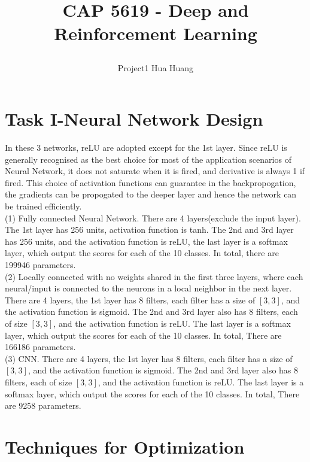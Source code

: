 \documentclass[12pt]{article}
\begin{document}
\title*{\centerline{\huge{CAP 5619 \-- Deep and Reinforcement Learning}}}
\author*{\centerline{Project1 Hua Huang}}%

\section{Task I-Neural Network Design}
In these 3 networks, reLU are adopted except for the 1st layer. Since
reLU is generally recognised as the best choice for most of the
application scenarios of Neural Network, it does not saturate when it
is fired, and derivative is always 1 if fired. This choice of
activation functions can guarantee in the backpropogation, the
gradients can be propogated to the deeper layer and hence the network
can be trained efficiently.\\
(1) Fully connected Neural Network. There are 4 layers(exclude the
input layer). The 1st layer has 256 units, activation function is
tanh. The 2nd and 3rd layer has 256 units, and the activation function
is reLU, the last layer is a softmax layer, which output the scores
for each of the 10 classes. In total, there are 199946 parameters.\\
(2) Locally connected with no weights shared in the first three
layers, where each neural/input is connected to the neurons in a local
neighbor in the next layer. There are 4 layers, the 1st layer has 8
filters, each filter has a size of $[3,3]$, and the activation function is
sigmoid. The 2nd and 3rd layer also has 8 filters, each of size $[3,3]$, and 
the activation function is reLU. The last layer is a softmax layer,
which output the scores for each of the 10 classes. In total, 
There are 166186 parameters.\\
(3) CNN. There are 4 layers, the 1st layer has 8
filters, each filter has a size of $[3,3]$, and the activation function is
sigmoid. The 2nd and 3rd layer also has 8 filters, each of size $[3,3]$, and 
the activation function is reLU. The last layer is a softmax layer,
which output the scores for each of the 10 classes. In total, 
There are 9258 parameters.\\

\section{Techniques for Optimization}
\end{document}
